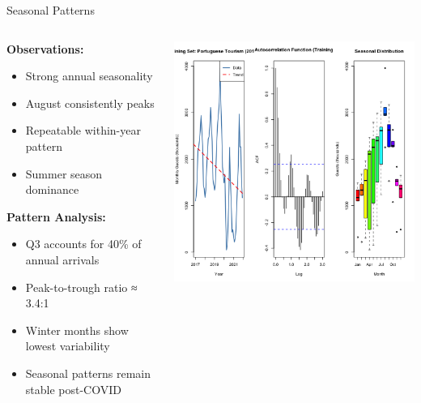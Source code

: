 \documentclass[10pt]{beamer}
\begin{document}
\begin{frame}{Seasonal Patterns}
\begin{columns}
\begin{column}{0.45\textwidth}
\textbf{Observations:}
\begin{itemize}
\item Strong annual seasonality
\item August consistently peaks
\item Repeatable within-year pattern
\item Summer season dominance
\end{itemize}

\vspace{0.3cm}
\textbf{Pattern Analysis:}
\begin{itemize}
\item Q3 accounts for 40\% of annual arrivals
\item Peak-to-trough ratio ≈ 3.4:1
\item Winter months show lowest variability
\item Seasonal patterns remain stable post-COVID
\end{itemize}
\end{column}

\begin{column}{0.55\textwidth}
\includegraphics[width=\textwidth,height=0.85\textheight,keepaspectratio]{plots/exploratory-analysis.png}
\end{column}
\end{columns}
\end{frame}
\end{document}

